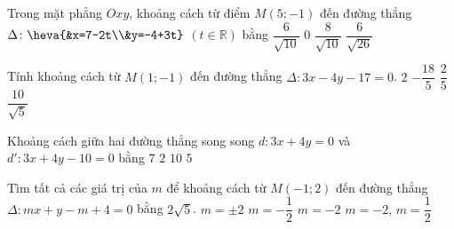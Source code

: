 	\begin{ex}%
		Trong mặt phẳng $Oxy$, khoảng cách từ điểm $M(5;-1)$ đến đường thẳng $\Delta\colon \heva{&x=7-2t\\&y=-4+3t}$ $(t\in\mathbb{R})$ bằng
		\choice
		{$\dfrac{6}{\sqrt{10}}$}
		{\True $0$}
		{$\dfrac{8}{\sqrt{10}}$}
		{$\dfrac{6}{\sqrt{26}}$}
	\end{ex}
	
	
	\begin{ex}%
		Tính khoảng cách từ $M(1;-1)$ đến đường thẳng $\Delta: 3x-4y-17=0$.
		\choice
		{\True $2$}
		{$-\dfrac{18}{5} $}
		{$\dfrac{2}{5} $}
		{$\dfrac{10}{\sqrt{5}} $}
	\end{ex}
	
	\begin{ex}%
		Khoảng cách giữa hai đường thẳng song song $d\colon 3x+4y=0$ và $d'\colon 3x+4y-10=0$ bằng
		\choice
		{$7 $}
		{\True $2 $}
		{$10 $}
		{$ 5$}
	\end{ex}
	
	
	
	
	\begin{ex}%
		Tìm tất cả các giá trị của $m$ để khoảng cách từ $M(-1;2)$ đến đường thẳng $\Delta: mx+y-m+4=0$ bằng $2\sqrt{5}$.
		\choice
		{$m=\pm 2$}
		{$m=-\dfrac{1}{2}$}
		{$m=-2$}
		{\True $m=-2$, $m=\dfrac{1}{2}$}
	\end{ex}
	
